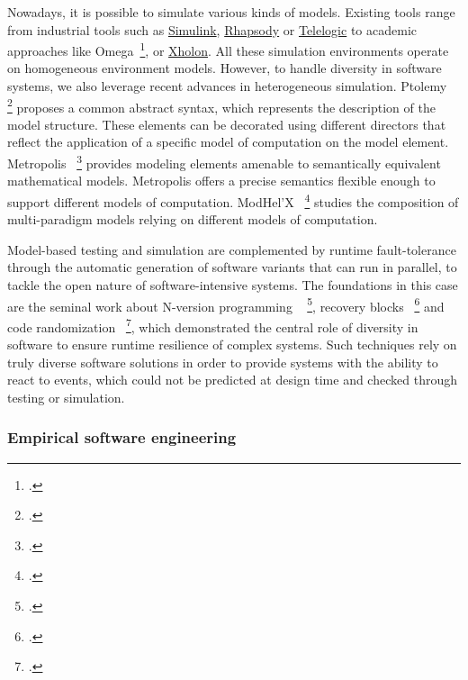 Nowadays, it is possible to simulate various kinds of models. Existing tools range from industrial tools such as \href{https://fr.mathworks.com/products/simulink.html}{Simulink}, \href{https://www.ibm.com/fr-fr/products/architect-for-software}{Rhapsody} or \href{https://www.ibm.com/support/pages/ibm-telelogic-rhapsody-74}{Telelogic} to academic approaches like Omega~\footcite{ober2006validating}, or \href{http://www.primordion.com/Xholon/}{Xholon}.  
All these simulation environments operate on  homogeneous environment models. However, to handle diversity in software systems, we also leverage recent advances in heterogeneous simulation. 
Ptolemy~ \footcite{buck1994ptolemy} proposes a common abstract syntax, which represents
the description of the model structure. These elements can be decorated using different
directors that reflect the application of a specific model of computation on the model element. 
Metropolis~ \footcite{balarin2003metropolis} provides modeling elements amenable to semantically
equivalent mathematical models. Metropolis offers a precise semantics flexible enough to
support different models of computation.
ModHel'X~ \footcite{hardebolle2008modhel} studies the composition of multi-paradigm models relying on
different models of computation. 

Model-based testing and simulation are complemented by runtime fault-tolerance through the automatic generation of software variants that can run in parallel, to tackle the open nature of software-intensive systems. The foundations in this case are  the seminal work about N-version programming ~ \footcite{avizienis85}, recovery blocks~ \footcite{randell75} and code randomization~ \footcite{barrantes05}, which demonstrated the central role of diversity in software to ensure runtime resilience of complex systems. Such techniques rely on truly diverse software solutions in order to provide systems with the ability to react to events, which could not be predicted at design time and checked through testing or simulation. 

\subsubsection{Empirical software engineering}

